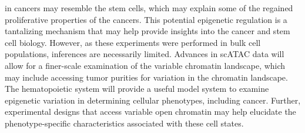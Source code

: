 \documentclass[12pt]{article}
\begin{document}
\begin{addmargin}[6.5mm]{4mm}
in cancers may resemble the stem cells, which may explain some of the regained proliferative properties of the cancers. This potential epigenetic regulation is a tantalizing mechanism that may help provide insights into the cancer and stem cell biology. However, as these experiments were performed in bulk cell populations, inferences are necessarily limited. Advances in scATAC data will allow for a finer-scale examination of the variable chromatin landscape, which may include accessing tumor purities for variation in the chromatin landscape. The hematopoietic system will provide a useful model system to examine epigenetic variation in determining cellular phenotypes, including cancer. Further, experimental designs that access variable open chromatin may help elucidate the phenotype-specific characteristics associated with these cell states. 

\end{addmargin}
\end{document}
